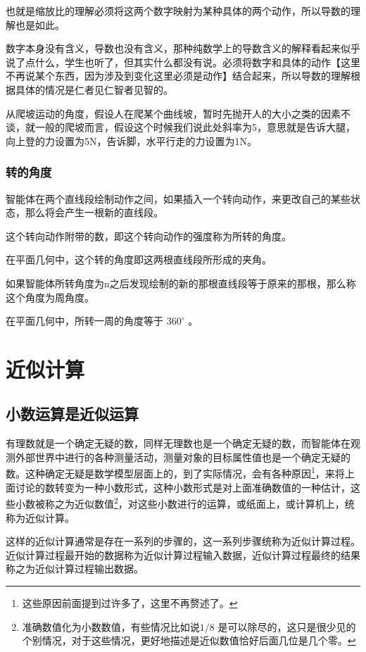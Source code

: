 \documentclass[12pt,oneside]{book}
\begin{document}
也就是缩放比的理解必须将这两个数字映射为某种具体的两个动作，所以导数的理解也是如此。

数字本身没有含义，导数也没有含义，那种纯数学上的导数含义的解释看起来似乎说了点什么，学生也听了，但其实什么都没有说。必须将数字和具体的动作【这里不再说某个东西，因为涉及到变化这里必须是动作】结合起来，所以导数的理解根据具体的情况是仁者见仁智者见智的。

从爬坡运动的角度，假设人在爬某个曲线坡，暂时先抛开人的大小之类的因素不谈，就一般的爬坡而言，假设这个时候我们说此处斜率为5，意思就是告诉大腿，向上登的力设置为5N，告诉脚，水平行走的力设置为1N。



\subsection{转的角度}
智能体在两个直线段绘制动作之间，如果插入一个转向动作，来更改自己的某些状态，那么将会产生一根新的直线段。

这个转向动作附带的数，即这个转向动作的强度称为所转的角度。

在平面几何中，这个转的角度即这两根直线段所形成的夹角。

如果智能体所转角度为n之后发现绘制的新的那根直线段等于原来的那根，那么称这个角度为周角度。

在平面几何中，所转一周的角度等于 $360^{\circ}$ 。





\chapter{近似计算}
\section{小数运算是近似运算}
有理数就是一个确定无疑的数，同样无理数也是一个确定无疑的数，而智能体在观测外部世界中进行的各种测量活动，测量对象的目标属性值也是一个确定无疑的数。这种确定无疑是数学模型层面上的，到了实际情况，会有各种原因\footnote{这些原因前面提到过许多了，这里不再赘述了。}，来将上面讨论的数转变为一种小数形式，这种小数形式是对上面准确数值的一种估计，这些小数被称之为近似数值\footnote{准确数值化为小数数值，有些情况比如说$ 1/8 $ 是可以除尽的，这只是很少见的个别情况，对于这些情况，更好地描述是近似数值恰好后面几位是几个零。}，对这些小数进行的运算，或纸面上，或计算机上，统称为近似计算。

这样的近似计算通常是存在一系列的步骤的，这一系列步骤统称为近似计算过程。近似计算过程最开始的数据称为近似计算过程输入数据，近似计算过程最终的结果称之为近似计算过程输出数据。
\end{document}
